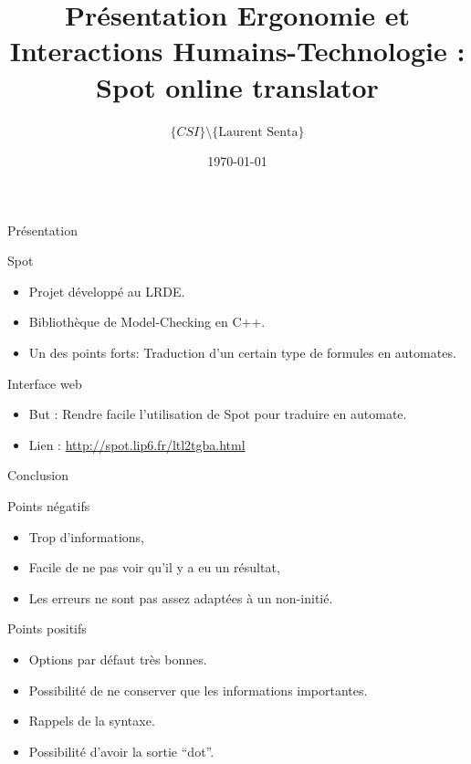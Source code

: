 \documentclass{beamer}
\author {$\{CSI\} \setminus \{\text{Laurent Senta}\}$}
\date\today
\title[Ergonomie: Spot online ]{Présentation Ergonomie et Interactions Humains-Technologie : \og Spot online translator\fg}
\institute{Epita - CSI}
\begin{document}
\begin{frame}
  \maketitle
\end{frame}


\begin{frame}{Présentation}
  \begin{block}{Spot}
    \begin{itemize}
    \item Projet développé au LRDE.
    \item Bibliothèque de Model-Checking en C++.
    \item Un des points forts: Traduction d'un certain type de formules
      en automates.
    \end{itemize}
  \end{block}

  \begin{block}{Interface web}
    \begin{itemize}
    \item But : Rendre facile l'utilisation de Spot pour traduire en
      automate.
    \item Lien : \url{http://spot.lip6.fr/ltl2tgba.html}
    \end{itemize}
  \end{block}
\end{frame}












\begin{frame}{Conclusion}
  \begin{block}{Points négatifs}
    \begin{itemize}
    \item<con@1-> Trop d'informations,
    \item<con@1-> Facile de ne pas voir qu'il y a eu un résultat,
    \item<con@1-> Les erreurs ne sont pas assez adaptées à un non-initié.
    \end{itemize}
  \end{block}

  \begin{block}{Points positifs}
    \begin{itemize}
    \item<pro@1-> Options par défaut très bonnes.
    \item<pro@1-> Possibilité de ne conserver que les informations
      importantes.
    \item<pro@1-> Rappels de la syntaxe.
    \item<pro@1-> Possibilité d'avoir la sortie ``dot''.
    \end{itemize}
  \end{block}
\end{frame}
\end{document}
